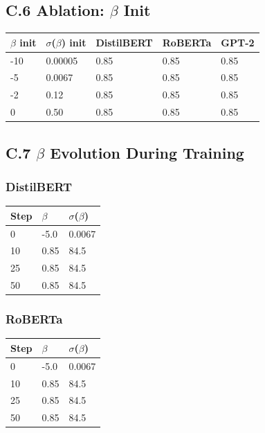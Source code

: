 \subsection{C.6 Ablation: $\beta$ Init}

\begin{table}[H]
\centering
\small
\begin{tabular}{lllll}
\toprule
\textbf{$\beta$ init} & \textbf{$\sigma$($\beta$) init} & \textbf{DistilBERT} & \textbf{RoBERTa} & \textbf{GPT-2} \\
\midrule
-10 & 0.00005 & 0.85 & 0.85 & 0.85 \\
-5 & 0.0067 & 0.85 & 0.85 & 0.85 \\
-2 & 0.12 & 0.85 & 0.85 & 0.85 \\
0 & 0.50 & 0.85 & 0.85 & 0.85 \\
\bottomrule
\end{tabular}
\end{table}

\subsection{C.7 $\beta$ Evolution During Training}

\subsubsection{DistilBERT}

\begin{table}[H]
\centering
\small
\begin{tabular}{lll}
\toprule
\textbf{Step} & \textbf{$\beta$} & \textbf{$\sigma$($\beta$)} \\
\midrule
0 & -5.0 & 0.0067 \\
10 & 0.85 & 84.5 \\
25 & 0.85 & 84.5 \\
50 & 0.85 & 84.5 \\
\bottomrule
\end{tabular}
\end{table}

\subsubsection{RoBERTa}

\begin{table}[H]
\centering
\small
\begin{tabular}{lll}
\toprule
\textbf{Step} & \textbf{$\beta$} & \textbf{$\sigma$($\beta$)} \\
\midrule
0 & -5.0 & 0.0067 \\
10 & 0.85 & 84.5 \\
25 & 0.85 & 84.5 \\
50 & 0.85 & 84.5 \\
\bottomrule
\end{tabular}
\end{table}

